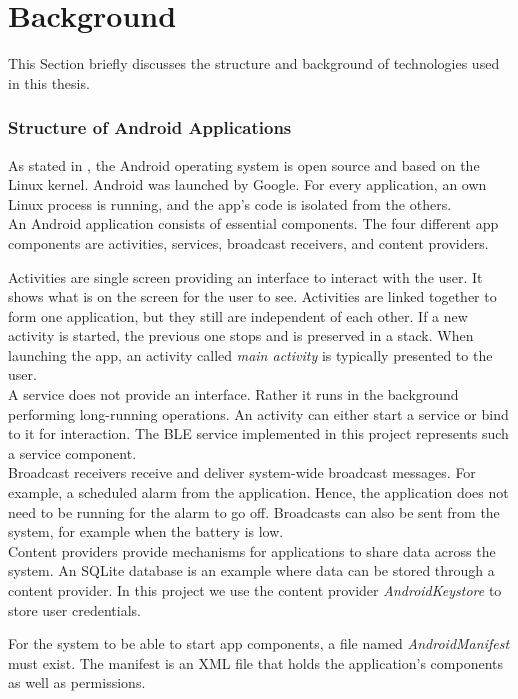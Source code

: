 \section{Background}
\label{background}
This Section briefly discusses the structure and background of technologies used in this thesis.

\subsubsection*{Structure of Android Applications}
As stated in \cite{liu2011research}, the Android operating system is open source and based on the Linux kernel. Android was launched by Google. For every application, an own Linux process is running, and the app's code is isolated from the others. \cite{AndroidFundamentals} \\
An Android application consists of essential components. The four different app components are activities, services, broadcast receivers, and content providers. \cite{liu2011research}

Activities are single screen providing an interface to interact with the user. It shows what is on the screen for the user to see. Activities are linked together to form one application, but they still are independent of each other. If a new activity is started, the previous one stops and is preserved in a stack. When launching the app, an activity called \textit{main activity} is typically presented to the user. \\
A service does not provide an interface. Rather it runs in the background performing long-running operations. An activity can either start a service or bind to it for interaction. \cite{AndroidFundamentals} The BLE service implemented in this project represents such a service component. \\
Broadcast receivers receive and deliver system-wide broadcast messages. For example, a scheduled alarm from the application. Hence, the application does not need to be running for the alarm to go off. Broadcasts can also be sent from the system, for example when the battery is low. \\
Content providers provide mechanisms for applications to share data across the system. An SQLite database is an example where data can be stored through a content provider. \cite{AndroidFundamentals} In this project we use the content provider \textit{AndroidKeystore} to store user credentials. 

For the system to be able to start app components, a file named \textit{AndroidManifest} must exist. The manifest is an XML file that holds the application's components as well as permissions. \cite{AndroidFundamentals} 

